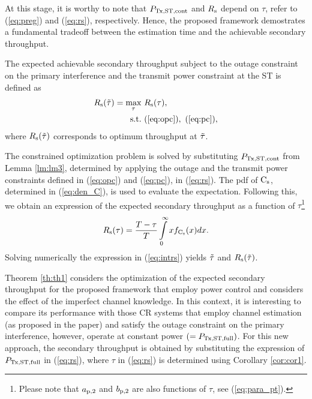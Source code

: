 At this stage, it is worthy to note that $P_{\text{Tx,ST,cont}}$ and $R_{\text{s}}$ depend on $\tau$, refer to (\ref{eq:preg}) and (\ref{eq:rs}), respectively. Hence, the proposed framework demostrates a fundamental tradeoff between the estimation time and the achievable secondary throughput.  
\begin{theorem} \label{th:th1}
\normalfont
The expected achievable secondary throughput subject to the outage constraint on the primary interference and the transmit power constraint at the ST is defined as
\begin{align}
R_{\text{s}}(\tilde{\tau}) = \operatorname*{max}_{\tau}  & \text{      } {R_{\text{s}}(\tau)}, 
 \label{eq:sys} \\
\text{s.t.} & \text{ } (\ref{eq:opc}), \text{  } (\ref{eq:pc}), \nonumber 
 \end{align}
where $R_{\text{s}}(\tilde{\tau})$ corresponds to optimum throughput at $\tilde{\tau}$.  
\end{theorem}
\begin{IEEEproof}
The constrained optimization problem is solved by substituting $P_{\text{Tx,ST,cont}}$ from Lemma \ref{lm:lm3}, determined by applying the outage and the transmit power constraints defined in (\ref{eq:opc}) and (\ref{eq:pc}), in (\ref{eq:rs}). 
The pdf of $\text{C}_{\text{s}}$, determined in (\ref{eq:den_C}), is used to evaluate the expectation. Following this, we obtain an expression of the expected secondary throughput as a function of $\tau$\footnote{Please note that $a_{\text{p,2}}$ and $b_{\text{p,2}}$ are also functions of $\tau$, see (\ref{eq:para_pt}).}
\begin{equation}
R_{\text{s}}(\tau) = \frac{T - \tau}{T} \int\limits_{0}^{\infty} x f_{\text{C}_{\text{s}}}(x) dx. \label{eq:intrs}
\end{equation}
Solving numerically the expression in (\ref{eq:intrs}) yields $\tilde{\tau}$ and $R_{\text{s}}(\tilde{\tau})$. 
\end{IEEEproof}
\begin{coro} \label{cor:cor2}
\normalfont
Theorem \ref{th:th1} considers the optimization of the expected secondary throughput for the proposed framework that employ power control and considers the effect of the imperfect channel knowledge. In this context, it is interesting to compare its performance with those CR systems that employ channel estimation (as proposed in the paper) and satisfy the outage constraint on the primary interference, however, operate at constant power $(= P_{\text{Tx,ST,full}})$. For this new approach, the secondary throughput is obtained by substituting the expression of $P_{\text{Tx,ST,full}}$ in (\ref{eq:rs}), where $\tau$ in (\ref{eq:rs}) is determined using Corollary \ref{cor:cor1}. 
\end{coro}

